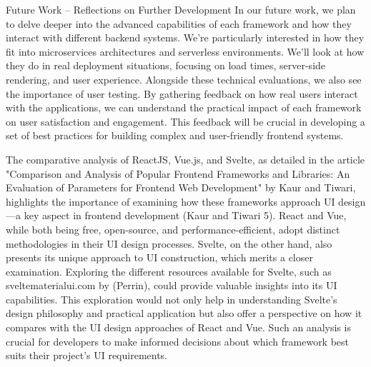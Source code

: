 Future Work – Reflections on Further Development
In our future work, we plan to delve deeper into the advanced capabilities of each framework and how they interact with different backend systems. We're particularly interested in how they fit into microservices architectures and serverless environments. We'll look at how they do in real deployment situations, focusing on load times, server-side rendering, and user experience. Alongside these technical evaluations, we also see the importance of user testing. By gathering feedback on how real users interact with the applications, we can understand the practical impact of each framework on user satisfaction and engagement. This feedback will be crucial in developing a set of best practices for building complex and user-friendly frontend systems.


The comparative analysis of ReactJS, Vue.js, and Svelte, as detailed in the article "Comparison and Analysis of Popular Frontend Frameworks and Libraries: An Evaluation of Parameters for Frontend Web Development" by Kaur and Tiwari, highlights the importance of examining how these frameworks approach UI design—a key aspect in frontend development (Kaur and Tiwari 5). React and Vue, while both being free, open-source, and performance-efficient, adopt distinct methodologies in their UI design processes. Svelte, on the other hand, also presents its unique approach to UI construction, which merits a closer examination.
Exploring the different resources available for Svelte, such as sveltematerialui.com by (Perrin), could provide valuable insights into its UI capabilities. This exploration would not only help in understanding Svelte’s design philosophy and practical application but also offer a perspective on how it compares with the UI design approaches of React and Vue. Such an analysis is crucial for developers to make informed decisions about which framework best suits their project's UI requirements.
